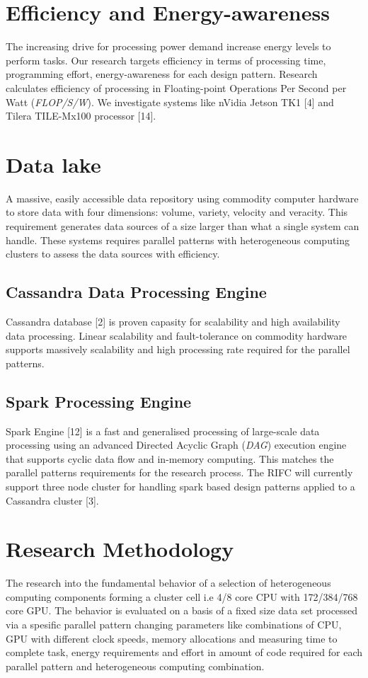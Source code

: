 \documentclass{acm_proc_article-sp}
\begin{document}
\section{Efficiency and Energy-awareness}
The increasing drive for processing power demand increase energy levels to perform tasks. Our research targets efficiency in terms of processing time, programming effort, energy-awareness for each design pattern. Research calculates efficiency of processing in Floating-point Operations Per Second per Watt (\textit{FLOP/S/W}). We investigate systems like nVidia Jetson TK1 [4] and Tilera TILE-Mx100 processor [14].
\section{Data lake}
A massive, easily accessible data repository using commodity computer hardware to store data with four dimensions: volume, variety, velocity and veracity. This requirement generates data sources of a size larger than what a single system can handle. These systems requires parallel patterns with heterogeneous computing clusters to assess the data sources with efficiency. 
\subsection{Cassandra Data Processing Engine}
Cassandra database [2] is proven capasity for scalability and high availability data processing. Linear scalability and fault-tolerance on commodity hardware supports massively scalability and high processing rate required for the parallel patterns.
\subsection{Spark Processing Engine}
Spark Engine [12] is a fast and generalised processing of large-scale data processing using an advanced Directed Acyclic Graph (\textit{DAG}) execution engine that supports cyclic data flow and in-memory computing. This matches the parallel patterns requirements for the research process. The RIFC will currently support three node cluster for handling spark based design patterns applied to a Cassandra cluster [3]. 
\section{Research Methodology}
The research into the fundamental behavior of a selection of heterogeneous computing components forming a cluster cell i.e 4/8 core CPU with 172/384/768 core GPU. The behavior is evaluated on a basis of a fixed size data set processed via a spesific parallel pattern changing parameters like combinations of CPU, GPU with different clock speeds, memory allocations and measuring time to complete task, energy requirements and effort in amount of code required for each parallel pattern and heterogeneous computing combination. 
\end{document}
